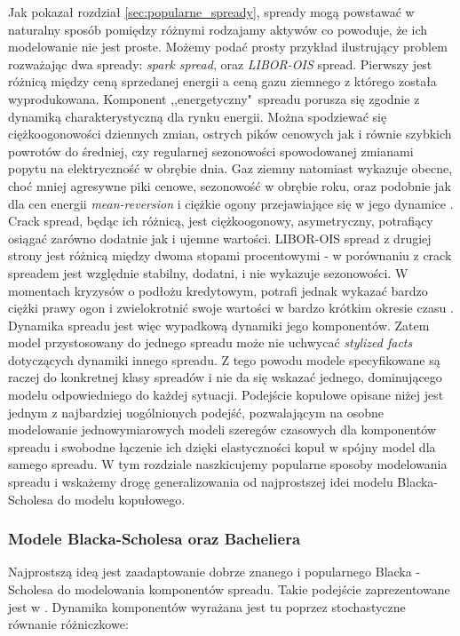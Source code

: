 Jak pokazał rozdział \ref{sec:popularne_spready}, spready mogą powstawać w naturalny sposób pomiędzy różnymi rodzajamy aktywów co powoduje, że ich modelowanie nie jest proste. Możemy podać prosty przykład ilustrujący problem rozważając dwa spready: \emph{spark spread}, oraz \emph{LIBOR-OIS} spread. Pierwszy jest różnicą między ceną sprzedanej energii a ceną gazu ziemnego z którego została wyprodukowana. Komponent ,,energetyczny"~spreadu porusza się zgodnie z dynamiką charakterystyczną dla rynku energii. Można spodziewać się ciężkoogonowości dziennych zmian, ostrych pików cenowych jak i równie szybkich powrotów do średniej, czy regularnej sezonowości spowodowanej zmianami popytu na elektryczność w obrębie dnia. Gaz ziemny natomiast wykazuje obecne, choć mniej agresywne piki cenowe, sezonowość w obrębie roku, oraz podobnie jak dla cen energii \emph{mean-reversion} i ciężkie ogony przejawiające się w jego dynamice \cite{Espen_Crack_Spread_Copula}. Crack spread, będąc ich różnicą, jest ciężkoogonowy, asymetryczny, potrafiący osiągać zarówno dodatnie jak i ujemne wartości. LIBOR-OIS spread z drugiej strony jest różnicą między dwoma stopami procentowymi - w porównaniu z crack spreadem jest względnie stabilny, dodatni, i nie wykazuje sezonowości. W momentach kryzysów o podłożu kredytowym, potrafi jednak wykazać bardzo ciężki prawy ogon i zwielokrotnić swoje wartości w bardzo krótkim okresie czasu \cite{Libor_OIS_model}.\\

Dynamika spreadu jest więc wypadkową dynamiki jego komponentów. Zatem model przystosowany do jednego spreadu może nie uchwycać \emph{stylized facts} dotyczących dynamiki innego spreadu. Z tego powodu modele specyfikowane są raczej do konkretnej klasy spreadów i nie da się wskazać jednego, dominującego modelu odpowiedniego do każdej sytuacji. Podejście kopułowe opisane niżej jest jednym z najbardziej uogólnionych podejść, pozwalającym na osobne modelowanie jednowymiarowych modeli szeregów czasowych dla komponentów spreadu i swobodne łączenie ich dzięki elastyczności kopuł w spójny model dla samego spreadu.
W tym rozdziale naszkicujemy popularne sposoby modelowania spreadu i wskażemy drogę generalizowania od najprostszej idei modelu Blacka-Scholesa do modelu kopułowego.

\subsubsection{Modele Blacka-Scholesa oraz Bacheliera}

Najprostszą ideą jest zaadaptowanie dobrze znanego i popularnego Blacka - Scholesa \cite{Black_Scholes} do modelowania komponentów spreadu. Takie podejście zaprezentowane jest w \cite{Bjerksund_Spread_Options_Lognormal}. Dynamika komponentów wyrażana jest tu poprzez stochastyczne równanie różniczkowe:

